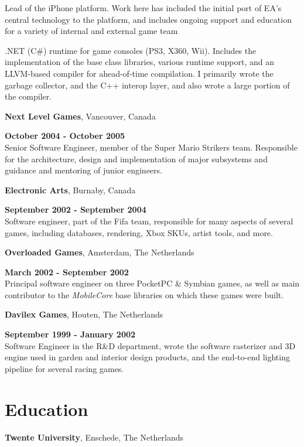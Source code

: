 \documentclass[margin, line, 11pt]{resume}
\begin{document}
\begin{resume}
Lead of the iPhone platform. Work here has included the initial port of EA's central technology to the
platform, and includes ongoing support and education for a variety of internal and external game team

.NET (C\#) runtime for game consoles (PS3, X360, Wii). Includes the implementation of the base class
libraries, various runtime support, and an LLVM-based compiler for ahead-of-time compilation. I
primarily wrote the garbage collector, and the C++ interop layer, and also wrote a large portion of the
compiler.

{\bf Next Level Games}, Vancouver, Canada

\vspace{-.3cm} \hfill {\bf October 2004 - October 2005}\\
Senior Software Engineer, member of the Super Mario Strikers team.
Responsible for the architecture, design and implementation of major
subsystems and guidance and mentoring of junior engineers.

{\bf Electronic Arts}, Burnaby, Canada

\vspace{-.3cm}
\hfill {\bf September 2002 - September 2004}\\
Software engineer, part of the Fifa team, responsible for many
aspects of several games, including databases, rendering, Xbox SKUs,
artist tools, and more.

{\bf Overloaded Games}, Amsterdam, The Netherlands

\vspace{-.3cm} \hfill {\bf March 2002 - September 2002}\\
Principal software engineer on three PocketPC \& Symbian games, as well as main contributor to the 
\emph{MobileCore} base libraries on which these games were built.

{\bf Davilex Games}, Houten, The Netherlands

\vspace{-.3cm}
\hfill {\bf September 1999 - January 2002}\\
Software Engineer in the R\&D department,
wrote the software rasterizer and 3D engine used in garden and interior design products, and the end-to-end lighting pipeline for several racing games.

\pagebreak

\section{\sc Education}
{\bf Twente University}, Enschede, The Netherlands


\end{resume}
\end{document}
